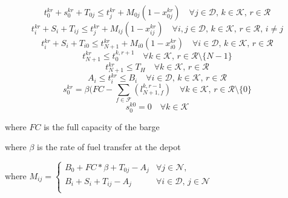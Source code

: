 \begin{equation} \label{eq:72}
t_{0}^{kr} + s_{0}^{kr} + T_{0j} \leq t_{j}^{kr} + M_{0j}(1 - x_{0j}^{kr}) 
\quad \forall j \in \mathcal{D}, \, k \in \mathcal{K}, \, r \in \mathcal{R}
\end{equation} %
\begin{equation} \label{eq:71}
t_{i}^{kr} + S_{i} + T_{ij} \leq t_{j}^{kr} + M_{ij}(1 - x_{ij}^{kr}) 
\quad \forall i,j \in \mathcal{D}, \, k \in \mathcal{K}, \, r \in \mathcal{R},\, i \ne j
\end{equation} %
\begin{equation} \label{eq:66}
t_{i}^{kr} + S_{i} + T_{i0} \leq t_{N+1}^{kr} + M_{i0}(1 - x_{i0}^{kr}) 
\quad \forall i \in \mathcal{D}, \, k \in \mathcal{K}, \, r \in \mathcal{R}
\end{equation} %
\begin{equation} \label{eq:67}
t_{N+1}^{kr} \leq t_0^{k,r+1} 
\quad \forall k \in \mathcal{K}, \, r \in \mathcal{R} \setminus \{N-1\}
\end{equation} %
\begin{equation} \label{eq:69}
t_{N+1}^{kr} \leq T_H 
\quad \forall k \in \mathcal{K}, \, r \in \mathcal{R}
\end{equation} %
\begin{equation} \label{eq:68}
A_{i}  \leq t_i^{kr} \leq B_{i }
\quad \forall i \in \mathcal{D}, \, k \in \mathcal{K}, \, r \in \mathcal{R}
\end{equation} %
\begin{equation} \label{eq:73}
s_{0}^{kr} = \beta (FC - \sum_{f \in \mathcal{F}}(l_{N+1,f}^{k,r-1}) 
\quad \forall k \in \mathcal{K}, \, r \in \mathcal{R} \setminus \{0\}
\end{equation}
\begin{equation} \label{eq:74}
s_{0}^{k0} = 0 \quad \forall k \in \mathcal{K}
\end{equation}

where $FC$ is the full capacity of the barge

where $\beta$ is the rate of fuel transfer at the depot

where $M_{ij} = \begin{cases}
B_{0} + FC*\beta + T_{0j} - A_{j} & \forall j \in \mathcal{N}, \\
B_{i} + S_{i} + T_{ij} - A_{j} & \forall i\in \mathcal{D}, \, j \in \mathcal{N} \\
\end{cases} $ 

